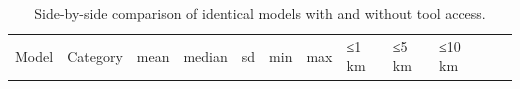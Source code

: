 \begin{longtable}[]{@{}
  >{\raggedright\arraybackslash}p{}
  >{\raggedright\arraybackslash}p{}
  >{\raggedright\arraybackslash}p{}
  >{\raggedright\arraybackslash}p{}
  >{\raggedright\arraybackslash}p{}
  >{\raggedright\arraybackslash}p{}
  >{\raggedright\arraybackslash}p{}
  >{\raggedright\arraybackslash}p{}
  >{\raggedright\arraybackslash}p{}
  >{\raggedright\arraybackslash}p{}
  >{\raggedright\arraybackslash}p{}
  >{\raggedright\arraybackslash}p{}@{}}
\caption{\label{tbl:tool_direct_comparison}Side-by-side comparison of
identical models with and without tool access.}\tabularnewline
\toprule\noalign{}
\begin{minipage}[b]{\linewidth}\raggedright
Model
\end{minipage} & \begin{minipage}[b]{\linewidth}\raggedright
Category
\end{minipage} & \begin{minipage}[b]{\linewidth}\raggedright
mean
\end{minipage} & \begin{minipage}[b]{\linewidth}\raggedright
median
\end{minipage} & \begin{minipage}[b]{\linewidth}\raggedright
sd
\end{minipage} & \begin{minipage}[b]{\linewidth}\raggedright
min
\end{minipage} & \begin{minipage}[b]{\linewidth}\raggedright
max
\end{minipage} & \begin{minipage}[b]{\linewidth}\raggedright
≤1 km
\end{minipage} & \begin{minipage}[b]{\linewidth}\raggedright
≤5 km
\end{minipage} & \begin{minipage}[b]{\linewidth}\raggedright
≤10 km
\end{minipage} & \begin{minipage}[b]{\linewidth}\raggedright

\end{minipage}
\end{longtable}
